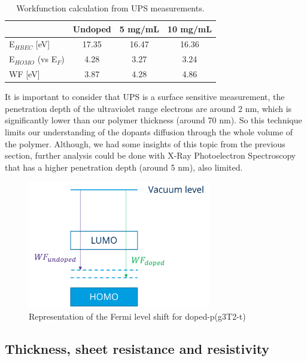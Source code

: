 \begin{table}[ht]
\centering
\caption{Workfunction calculation from UPS measurements.}
\begin{tabular}{l|c|c|c}
& Undoped & 5 mg/mL & 10 mg/mL \\\hline
E$_{HBEC}$ [eV] & 17.35 & 16.47 & 16.36\\
E$_{HOMO}$ (vs E$_{F}$) & 4.28 & 3.27 & 3.24\\
WF [eV] & 3.87 & 4.28 & 4.86\\\hline
\end{tabular}
\label{tab:ups}
\end{table}

It is important to consider that UPS is a surface sensitive measurement, the penetration depth of the ultraviolet range electrons are around 2 nm, which is significantly lower than our polymer thickness (around 70 nm). So this technique limits our understanding of the dopants diffusion through the whole volume of the polymer. Although, we had some insights of this topic from the previous section, further analysis could be done with X-Ray Photoelectron Spectroscopy that has a higher penetration depth (around 5 nm), also limited. %

\begin{figure}[ht]
  \centering
  \includegraphics[width=8cm]{Images/pdf/WF.pdf}
  \caption[Representation of the Fermi level shift upon doping]{Representation of the Fermi level shift for doped-p(g3T2-t)}
  \label{fig:ups}
\end{figure}

\subsection{Thickness, sheet resistance and resistivity}


